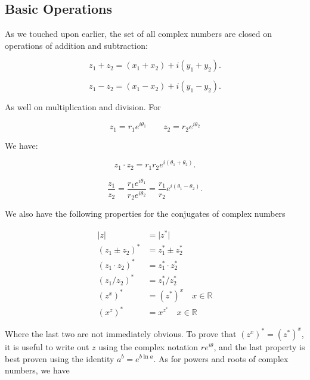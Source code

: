 \documentclass[12pt]{article}
\theoremstyle{definition}
\begin{document}


\subsection{Basic Operations}

As we touched upon earlier, the set of all complex numbers are closed on operations of addition and subtraction:

$$z_1+z_2=(x_1+x_2)+i(y_1+y_2).$$

$$z_1-z_2=(x_1-x_2)+i(y_1-y_2).$$

As well on multiplication and division. For 

$$z_1=r_1 e^{i\theta_1} \qquad z_2=r_2 e^{i\theta_2}$$ 

We have:

$$z_1\cdot z_2=r_1 r_2 e^{i(\theta_1+\theta_2)}.$$

$$\displaystyle \frac{z_1}{z_2}=\frac{r_1 e^{i\theta_1}}{r_2 e^{i\theta_2}}=\frac{r_1}{r_2}e^{i(\theta_1-\theta_2)}.$$

We also have the following properties for the conjugates of complex numbers

\begin{align*}
    \vert z \vert &= \vert z^* \vert \\
    (z_1 \pm z_2)^* &= z_1^* \pm z_2^* \\
    (z_1 \cdot z_2)^* &= z_1^* \cdot z_2^* \\
    (z_1 / z_2)^* &= z_1^* / z_2^* \\
    (z^x)^* &= (z^*)^x \quad x \in \mathbb{R}\\
    (x^z)^* &= x^{z^*} \quad x \in \mathbb{R}
\end{align*}

Where the last two are not immediately obvious. To prove that $(z^x)^* = (z^*)^x$, it is useful to write out $z$ using the complex notation $r e^{i\theta}$, and the last property is best proven using the identity $a^b = e^{b \ln a}$. As for powers and roots of complex numbers, we have 
\end{document}
